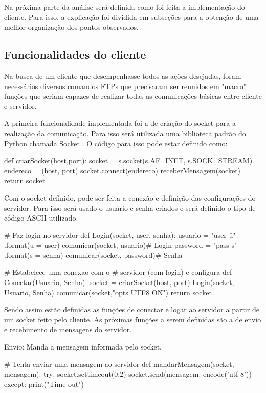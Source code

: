 \documentclass[11pt]{IEEEtran}
\begin{document}
Na próxima parte da análise será definida como foi feita a implementação do cliente. Para isso, a explicação foi dividida em subseções para a obtenção de uma melhor organização dos pontos observados.

\subsection{Funcionalidades do cliente}
Na busca de um cliente que desempenhasse todos as ações desejadas, foram necessários diversos comandos FTPs que precisaram ser reunidos em "macro" funções que seriam capazes de realizar todas as comunicações básicas entre cliente e servidor.

A primeira funcionalidade implementada foi a de criação do socket para a realização da comunicação. Para isso será utilizada uma biblioteca padrão do Python chamada Socket \cite{socket}. O código para isso pode estar definido como:
\begin{python}
def criarSocket(host,port):   
    socket = s.socket(s.AF_INET, 
    s.SOCK_STREAM)
    endereco = (host, port)
    socket.connect(endereco)
    receberMensagem(socket) 
    return socket
\end{python}

Com o socket definido, pode ser feita a conexão e definição das configurações do servidor. Para isso será usado o usuário e senha criados e será definido o tipo de código ASCII utilizado.
\begin{python}
# Faz login no servidor
def Login(socket, user, senha):
    usuario = "user {u}\r\n"
    .format(u = user)
    comunicar(socket, usuario)# Login
    password = "pass {s}\r\n"
    .format(s = senha)
    comunicar(socket, password)# Senha

# Estabelece uma conexao com o 
# servidor (com login) e configura
def Conectar(Usuario, Senha):
   socket = criarSocket(host, port)
   Login(socket, Usuario, Senha)
   comunicar(socket,"opts UTF8 ON\r\n")
   return socket
\end{python}

Sendo assim estão definidas as funções de conectar e logar ao servidor a partir de um socket feito pelo cliente. As próximas funções a serem definidas são a de envio e recebimento de mensagens do servidor.

Envio: Manda a mensagem informada pelo socket.
\begin{python}
# Tenta enviar uma mensagem ao servidor
def mandarMensagem(socket, mensagem):
  try:
    socket.settimeout(0.2)
    socket.send(mensagem.
           encode('utf-8'))
  except:
    print("Time out")
\end{python}
\end{document}

